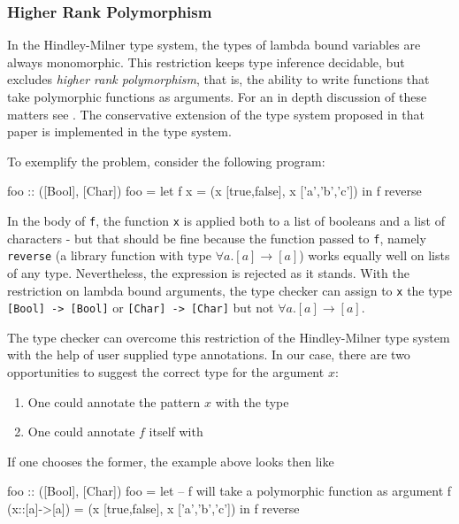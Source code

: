 \subsubsection{Higher Rank Polymorphism} \label{higher-rank}

In the Hindley-Milner type system, the types of lambda bound variables are always monomorphic. This restriction keeps type inference decidable, but excludes \emph{higher rank polymorphism}, that is, the ability to write functions that take polymorphic functions as arguments. For an in depth discussion of these matters see \cite{ptifart}. The conservative extension of the type system proposed in that paper is  implemented in the \frege{} type system.

To exemplify the problem, consider the following program:

\begin{code}
foo :: ([Bool], [Char])
foo = let
        f x = (x [true,false], x ['a','b','c'])
    in f reverse
\end{code}

In the body of \texttt{f}, the function \texttt{x} is applied both to a list of booleans and a list of characters - but that should be fine because the function passed to \texttt{f}, namely \texttt{reverse} (a library function with type $\forall{} a$.$[a] \rightarrow{} [a]$) works equally well on lists of any type. Nevertheless, the expression is rejected as it stands. With the restriction on lambda bound arguments, the type checker can assign to \texttt{x} the type \texttt{[Bool] -> [Bool]} or \texttt{[Char] -> [Char]} but not $\forall{} a$.$[a] \rightarrow{} [a]$.

The \frege{} type checker can overcome this restriction of the Hindley-Milner type system with the help of user supplied type annotations. In our case, there are two opportunities to suggest the correct type for the argument $x$:
\begin{enumerate}
\item One could annotate the pattern $x$ with the type 
\item One could annotate $f$ itself with 
\end{enumerate}

If one chooses the former, the example above looks then like

\begin{code}
foo :: ([Bool], [Char])
foo = let
        -- f will take a polymorphic function as argument
        f (x::[a]->[a]) = (x [true,false], x ['a','b','c'])
    in f reverse
\end{code}

